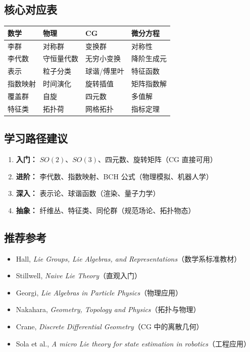 \subsection{核心对应表}

\begin{center}
\begin{tabular}{p{3cm}p{3cm}p{3cm}p{3cm}}
\toprule
\textbf{数学} & \textbf{物理} & \textbf{CG} & \textbf{微分方程} \\
\midrule
李群 & 对称群 & 变换群 & 对称性 \\
李代数 & 守恒量代数 & 无穷小变换 & 降阶生成元 \\
表示 & 粒子分类 & 球谐/傅里叶 & 特征函数 \\
指数映射 & 时间演化 & 旋转插值 & 矩阵指数解 \\
覆盖群 & 自旋 & 四元数 & 多值解 \\
特征类 & 拓扑荷 & 网格拓扑 & 指标定理 \\
\bottomrule
\end{tabular}
\end{center}

\subsection{学习路径建议}

\begin{enumerate}
  \item \textbf{入门：} $SO(2)$、$SO(3)$、四元数、旋转矩阵（CG 直接可用）
  \item \textbf{进阶：} 李代数、指数映射、BCH 公式（物理模拟、机器人学）
  \item \textbf{深入：} 表示论、球谐函数（渲染、量子力学）
  \item \textbf{抽象：} 纤维丛、特征类、同伦群（规范场论、拓扑物态）
\end{enumerate}

\subsection{推荐参考}

\begin{itemize}
  \item Hall, \textit{Lie Groups, Lie Algebras, and Representations}（数学系标准教材）
  \item Stillwell, \textit{Naive Lie Theory}（直观入门）
  \item Georgi, \textit{Lie Algebras in Particle Physics}（物理应用）
  \item Nakahara, \textit{Geometry, Topology and Physics}（拓扑与物理）
  \item Crane, \textit{Discrete Differential Geometry}（CG 中的离散几何）
  \item Sola et al., \textit{A micro Lie theory for state estimation in robotics}（工程应用）
\end{itemize}